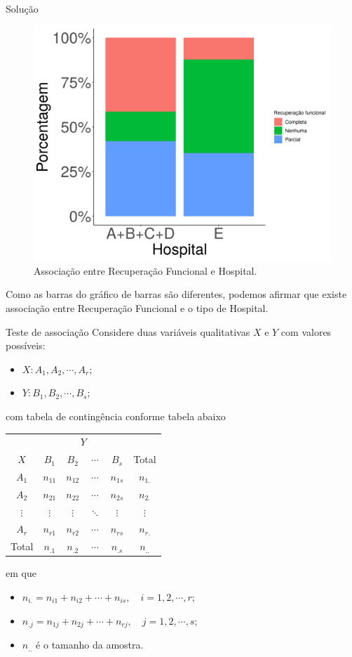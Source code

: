 \documentclass[9pt]{beamer}
\begin{document}
\begin{frame}{Solução}

\begin{figure}[htbp]
	\centering
	\caption{Associação entre Recuperação Funcional e Hospital.}
	\includegraphics[width = 0.6\linewidth]{figures/associacao_moderada.png}
\end{figure}

Como as barras do gráfico de barras são diferentes, podemos afirmar que existe associação entre Recuperação Funcional e o tipo de Hospital.
\end{frame}

\begin{frame}{Teste de associação}
Considere duas variáveis qualitativas $X$ e $Y$ com valores possíveis:
\begin{itemize}
	\item $X: A_1, A_2, \cdots, A_r$;
	\item $Y: B_1, B_2, \cdots, B_s$;
\end{itemize}
com tabela de contingência conforme tabela abaixo
\begin{table}[htbp]
	\centering
	\begin{tabular}{c|cccc|c}
		\toprule[0.05cm]
		& \multicolumn{4}{|c|}{$Y$} & \\ \cmidrule[0.05cm]{2-5}
		$X$ & $B_1$ & $B_2$ & $\cdots$ & $B_s$ & Total\\ \midrule[0.05cm]
		$A_1$ & $n_{11}$ & $n_{12}$ & $\cdots$ & $n_{1s}$ & $n_{1.}$\\
		$A_2$ & $n_{21}$ & $n_{22}$ & $\cdots$ & $n_{2s}$ & $n_{2.}$\\
		$\vdots$ & $\vdots$ & $\vdots$ & $\ddots$ & $\vdots$ & $\vdots$\\
		$A_r$ & $n_{r1}$ & $n_{r2}$ & $\cdots$ & $n_{rs}$ & $n_{r.} $\\ \midrule[0.05cm]
		Total & $n_{.1}$ & $n_{.2}$ & $\cdots$ & $n_{.s}$ & $n_{..}$\\
		\bottomrule[0.05cm]
	\end{tabular}
\end{table}
em que 
\begin{itemize}
	\item $n_{i.} = n_{i1}+n_{i2}+\cdots+n_{is}, \quad i =1,2, \cdots, r$;
	\item $n_{.j} = n_{1j}+n_{2j}+\cdots+n_{rj}, \quad j =1,2, \cdots, s$;
	\item $n_{..}$ é o tamanho da amostra.
\end{itemize}

\end{frame}
\end{document}
